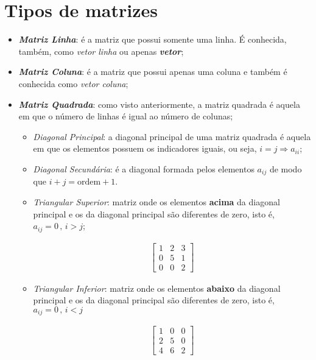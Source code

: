 \section{Tipos de matrizes}
\begin{itemize}
	\item \textit{\textbf{Matriz Linha}}: é a matriz que possui somente uma linha. É conhecida, também, como \textit{vetor linha} ou apenas \textit{\textbf{vetor}}; 
	\item \textit{\textbf{Matriz Coluna}}: é a matriz que possui apenas uma coluna e também é conhecida como \textit{vetor coluna};
	\item \textit{\textbf{Matriz Quadrada}}: como visto anteriormente, a matriz quadrada é aquela em que o número de linhas é igual ao número de colunas;
	\begin{itemize}
		\item \textit{Diagonal Principal}: a diagonal principal de uma matriz quadrada é aquela em que os elementos possuem os indicadores iguais, ou seja, $i=j \Rightarrow a_{ii}$;
		\item \textit{Diagonal Secundária}: é a diagonal formada pelos elementos $a_{ij}$ de modo que $i+j=\textrm{ordem}+1$.
		\item \textit{Triangular Superior}: matriz onde os elementos \textbf{acima} da diagonal principal e os da diagonal principal são diferentes de
		zero, isto é, $a_{ij}=0 \, , \, i>j$;
		\begin{ceqn}
			\begin{align*}
					\begin{bmatrix}1 & 2 & 3\\
			0 & 5 & 1\\
			0 & 0 & 2
			\end{bmatrix}
			\end{align*}
		\end{ceqn}
		\item \textit{Triangular Inferior}: matriz onde os elementos \textbf{abaixo} da diagonal principal e os da diagonal principal são diferentes de
		zero, isto é, $a_{ij}=0 \, , \, i<j$
		\begin{ceqn}
			\begin{align*}
			\begin{bmatrix}1 & 0 & 0\\
			2 & 5 & 0\\
			4 & 6 & 2
			\end{bmatrix}
			\end{align*}
		\end{ceqn}

\end{itemize}
\end{itemize}
